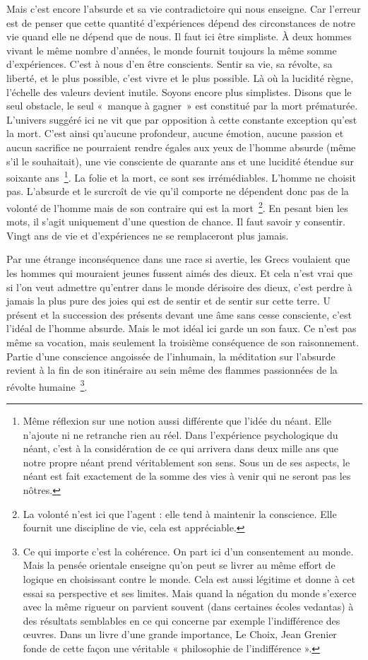 \documentclass{book}
\begin{document}
Mais c'est encore l'absurde et sa vie contradictoire qui nous enseigne. Car l'erreur est de penser que cette quantité d'expériences dépend des circonstances de notre vie quand elle ne dépend que de nous. Il faut ici être simpliste. À deux hommes vivant le même nombre d'années, le monde fournit toujours la même somme d'expériences. C'est à nous d'en être conscients. Sentir sa vie, sa révolte, sa liberté, et le plus possible, c'est vivre et le plus possible. Là où la lucidité règne, l'échelle des valeurs devient inutile. Soyons encore plus simplistes. Disons que le seul obstacle, le seul « manque à gagner » est constitué par la mort prématurée. L'univers suggéré ici ne vit que par opposition à cette constante exception qu'est la mort. C'est ainsi qu'aucune profondeur, aucune émotion, aucune passion et aucun sacrifice ne pourraient rendre égales aux yeux de l'homme absurde (même s'il le souhaitait), une vie consciente de quarante ans et une lucidité étendue sur soixante ans \footnote{Même réflexion sur une notion aussi différente que l’idée du néant. Elle n’ajoute ni ne retranche rien au réel. Dans l’expérience psychologique du néant, c’est à la considération de ce qui arrivera dans deux mille ans que notre propre néant prend véritablement son sens. Sous un de ses aspects, le néant est fait exactement de la somme des vies à venir qui ne seront pas les nôtres.}. La folie et la mort, ce sont ses irrémédiables. L'homme ne choisit pas. L'absurde et le surcroît de vie qu'il comporte ne dépendent donc pas de la volonté de l'homme mais de son contraire qui est la mort \footnote{La volonté n’est ici que l’agent : elle tend à maintenir la conscience. Elle fournit une discipline de vie, cela est appréciable.}. En pesant bien les mots, il s'agit uniquement d'une question de chance. Il faut savoir y consentir. Vingt ans de vie et d'expériences ne se remplaceront plus jamais.

Par une étrange inconséquence dans une race si avertie, les Grecs voulaient que les hommes qui mouraient jeunes fussent aimés des dieux. Et cela n'est vrai que si l'on veut admettre qu'entrer dans le monde dérisoire des dieux, c'est perdre à jamais la plus pure des joies qui est de sentir et de sentir sur cette terre. U présent et la succession des présents devant une âme sans cesse consciente, c'est l'idéal de l'homme absurde. Mais le mot idéal ici garde un son faux. Ce n'est pas même sa vocation, mais seulement la troisième conséquence de son raisonnement. Partie d'une conscience angoissée de l'inhumain, la méditation sur l'absurde revient à la fin de son itinéraire au sein même des flammes passionnées de la révolte humaine \footnote{Ce qui importe c’est la cohérence. On part ici d’un consentement au monde. Mais la pensée orientale enseigne qu’on peut se livrer au même effort de logique en choisissant contre le monde. Cela est aussi légitime et donne à cet essai sa perspective et ses limites. Mais quand la négation du monde s’exerce avec la même rigueur on parvient souvent (dans certaines écoles vedantas) à des résultats semblables en ce qui concerne par exemple l’indifférence des œuvres. Dans un livre d’une grande importance, Le Choix, Jean Grenier fonde de cette façon une véritable « philosophie de l’indifférence ».}.
\end{document}
